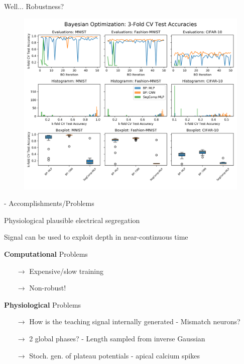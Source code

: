 \documentclass[dvipsnames, usenames]{beamer}
\newcommand{\cmark}{\ding{51}}%
\newcommand{\xmark}{\ding{55}}%
\newcommand{\done}{\rlap{$\square$}{\raisebox{2pt}{\large\hspace{1pt}\cmark}}%
\hspace{-2.5pt}}
\newcommand{\wontfix}{\rlap{$\square$}{\large\hspace{1pt}\xmark}}
\begin{document}

\begin{frame}{Well... Robustness?}
	\begin{figure}
		\centering
		\includegraphics[width=\textwidth]{../figures/bayes_opt_comparison}
	\end{figure}
\end{frame}

\begin{frame}{\citet{guerguiev2017} - Accomplishments/Problems}

\begin{todolist}
	\item[\done] Physiological plausible electrical segregation
	\item[\done] Signal can be used to exploit depth in near-continuous time
	\item[\wontfix] \textbf{Computational} Problems
	\begin{itemize}
		\item[$\to$] Expensive/slow training
		\item[$\rightarrow$] Non-robust!
	\end{itemize}
	\item[\wontfix] \textbf{Physiological} Problems
	\begin{itemize}
	\item[$\rightarrow$] How is the teaching signal internally generated - Mismatch neurons?
	\item[$\rightarrow$] 2 global phases? - Length sampled from inverse Gaussian
	\item[$\rightarrow$] Stoch. gen. of plateau potentials - apical calcium spikes
	\end{itemize}
\end{todolist}
\end{frame}
\end{document}
